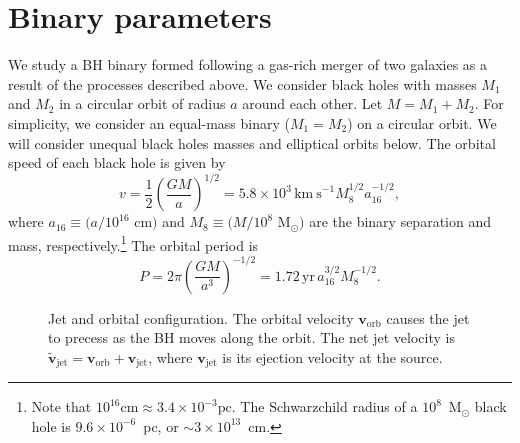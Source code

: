 \documentclass[a4paper,fleqn,usenatbib]{mnras}
\begin{document}
\section{Binary parameters}

We study a BH binary formed following a gas-rich merger of two
galaxies as a result of the processes described above.  We consider
black holes with masses $M_1$ and $M_2$ in a circular orbit of radius
$a$ around each other.  Let $M=M_1+M_2$.  For simplicity, we consider
an equal-mass binary ($M_1=M_2$) on a circular orbit. We will consider
unequal black holes masses and elliptical orbits below.  The orbital
speed of each black hole is given by \citep{2010PhRvD..81d7503L}
\begin{equation}
  v = \frac{1}{2}\left(\frac{GM}{a}\right)^{1/2}\!\!\!\! = 5.8\times 10^3\, \mathrm{km~s}^{-1}M_8^{1/2}a_{16}^{-1/2},
  \label{eqn:vorb}
\end{equation}
where $a_{16}\equiv (a/10^{16}$ cm$)$ and $M_8\equiv (M/10^8$
M$_\odot)$ are the binary separation and mass,
respectively.\footnote{Note that $10^{16} \mathrm{cm}\approx 3.4\times
  10^{-3} \mathrm{pc}$.  The Schwarzchild radius of a $10^8$~M$_\odot$
  black hole is $9.6\times 10^{-6}$~pc, or $\sim 3\times 10^{13}$~cm.}
The orbital period is
\begin{equation}
  P = 2\pi\left(\frac{GM}{a^3}\right)^{-1/2}\!\!\!\! = 1.72\, \mathrm{yr}\, a_{16}^{3/2} M_8^{-1/2}.
\end{equation}

\begin{figure}
  \begin{center}
  \end{center}
  \caption{Jet and orbital configuration. The orbital velocity
    $\mathbf{v}_\mathrm{orb}$ causes the jet to precess as the BH
    moves along the orbit. The net jet velocity is
    $\tilde{\mathbf{v}}_\mathrm{jet}={\mathbf{v}}_\mathrm{orb}+{\mathbf{v}}_\mathrm{jet}$,
    where $\mathbf{v}_\mathrm{jet}$ is its ejection velocity at the
    source.}
  \label{fig:BH_orbit}
\end{figure}
\end{document}
